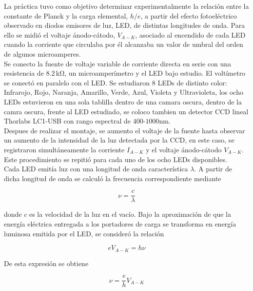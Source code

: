 

La práctica tuvo como objetivo determinar experimentalmente la relación entre la constante de Planck y la carga elemental, $h/e$, a partir del efecto fotoeléctrico observado en diodos emisores de luz, LED, de distintas longitudes de onda. Para ello se midió el voltaje ánodo-cátodo, $V_{A-K}$, asociado al encendido de cada LED cuando la corriente que circulaba por él alcanzaba un valor de umbral del orden de algunos microamperes.\\

Se conecto la fuente de voltaje variable de corriente directa en serie con una resistencia de $8.2\,\mathrm{k\Omega}$, un microamperímetro y el LED bajo estudio. El voltímetro se conectó en paralelo con el LED. Se estudiaron 8 LEDs de distinto color: Infrarojo, Rojo, Naranja, Amarillo, Verde, Azul, Violeta y Ultravioleta, los ocho LEDs estuvieron en una sola tablilla dentro de una camara oscura, dentro de la camra oscura, frente al LED estudiado, se coloco tambien un detector CCD lineal Thorlabs LC1-USB con rango espectral de $400$-$1000$nm.\\

Despues de realizar el montaje, se aumento el voltaje de la fuente hasta observar un aumento de la intensidad de la luz detectada por la CCD, en este caso, se registraron simultáneamente la corriente $I_{A-K}$ y el voltaje ánodo-cátodo $V_{A-K}$. Este procedimiento se repitió para cada uno de los ocho LEDs disponibles.\\

Cada LED emitía luz con una longitud de onda característica $\lambda$. A partir de dicha longitud de onda se calculó la frecuencia correspondiente mediante

\begin{equation}
    \nu = \frac{c}{\lambda}
\end{equation}

donde $c$ es la velocidad de la luz en el vacío. Bajo la aproximación de que la energía eléctrica entregada a los portadores de carga se transforma en energía luminosa emitida por el LED, se consideró la relación

\begin{equation}
    eV_{A-K} = h\nu
\end{equation}

De esta expresión se obtiene

\begin{equation}
   \nu = \frac{e}{h} V_{A-K}
\end{equation}

